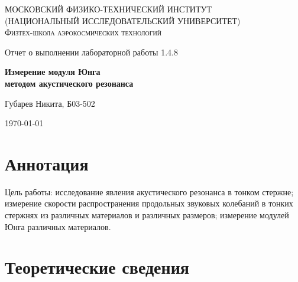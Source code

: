 \documentclass[a4paper]{article}
\begin{document}
\begin{titlepage}
	\centering
	{\scshape\Large МОСКОВСКИЙ ФИЗИКО-ТЕХНИЧЕСКИЙ ИНСТИТУТ \\
	(НАЦИОНАЛЬНЫЙ ИССЛЕДОВАТЕЛЬСКИЙ УНИВЕРСИТЕТ)\\ %
    Физтех-школа аэрокосмических технологий}
	
	\vspace{4cm} %
	{\LARGE Отчет о выполнении лабораторной работы 1.4.8}
	\vspace{1cm} %
	
{\huge\bf Измерение модуля Юнга \\ методом акустического резонанса}
	
	\vspace{1cm} %
	\vfill %
	
    \begin{flushright} %
	   {\LARGE Губарев Никита, Б03-502}
    \end{flushright}
    \vfill 
	\today %
\end{titlepage}
\tableofcontents 
 \section{Аннотация}
Цель работы: исследование явления акустического резонанса в тонком стержне; измерение скорости распространения продольных звуковых колебаний в тонких стержнях из различных материалов и различных размеров; измерение модулей Юнга различных материалов.

\section{Теоретические сведения}
\end{document}
